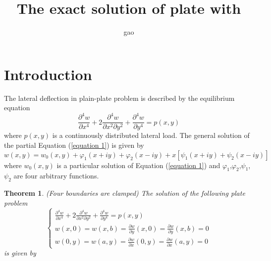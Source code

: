 \documentclass[a4paper]{article}      %
\title{The exact solution of plate with}        %
\author{gao}
\begin{document}
\maketitle

\section{Introduction}
The lateral deflection in plain-plate problem is described by the equilibrium equation
    \begin{equation}\label{equation 1}                                       %
    \frac{\partial^{4}w}{\partial x^{4}}+ 2\frac{\partial^{4}w}{\partial x^{2} \partial y^{2}}+\frac{\partial^{4}w}{\partial y^{4}}=p(x,y)
    \end{equation}
where $ p(x,y)$ is a continuously distributed lateral load.
The general solution of the partial Equation (\ref{equation 1}) is given by
    \begin{equation}\label{equation 2}                                       %
    w(x,y)=w_{0}(x,y)+\varphi_{1}(x+iy)+\varphi_{2}(x-iy)+x[\psi_{1}(x+iy)+\psi_{2}(x-iy)]
    \end{equation}
where $w_{0}(x,y)$ is a particular solution of Equation (\ref{equation 1}) and $\varphi_{1}$,$\varphi_{2}$,$\psi_{1}$,$\psi_{2}$ are four arbitrary functions.
\newtheorem{theorem}{Theorem}[section]
\begin{theorem}                                                             %
  (Four boundaries are clamped) The solution of the following plate problem
    \begin{equation}\label{equation 3}                                       %
     \left\{ {\begin{array}{*{20}{c}}
    {\frac{{{\partial ^4}w}}{{\partial {x^4}}} + 2\frac{{{\partial ^4}w}}{{\partial {x^2}\partial {y^2}}} + \frac{{{\partial ^4}w}}{{\partial {y^4}}} = p(x,y)}\\
    {w(x,0)=w(x,b)=\frac{{\partial w}}{{\partial y}}(x,0)=\frac{{\partial w}}{{\partial y}}(x,b)=0}\\
    {w(0,y)=w(a,y)=\frac{{\partial w}}{{\partial x}}(0,y)=\frac{{\partial w}}{{\partial x}}(a,y)=0}
    \end{array}} \right.
    \end{equation}
is given by
\end{theorem}
\end{document}
